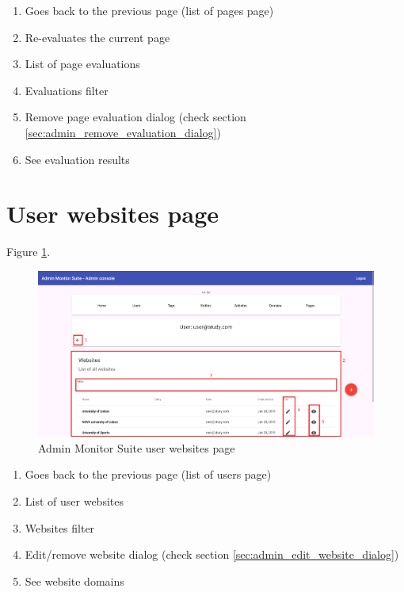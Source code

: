 \begin{enumerate}
    \item Goes back to the previous page (list of pages page)
    \item Re-evaluates the current page
    \item List of page evaluations
    \item Evaluations filter
    \item Remove page evaluation dialog (check section \ref{sec:admin_remove_evaluation_dialog})
    \item See evaluation results
\end{enumerate}

\clearpage

\section{User websites page}

Figure \ref{fig:admin_user_websites_page}.

\begin{figure}[H]
    \centering
    \includegraphics[width=\linewidth]{lib/images/admin/admin_user_websites_page.png}
    \caption{Admin Monitor Suite user websites page}
    \label{fig:admin_user_websites_page}
\end{figure}

\begin{enumerate}
    \item Goes back to the previous page (list of users page)
    \item List of user websites
    \item Websites filter
    \item Edit/remove website dialog (check section \ref{sec:admin_edit_website_dialog})
    \item See website domains
\end{enumerate}

